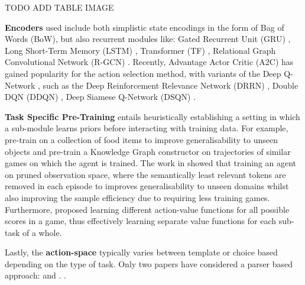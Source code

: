 \documentclass{article}
\begin{document}
TODO ADD TABLE IMAGE

\textbf{Encoders} used include both simplistic state encodings in the form of Bag of Words (BoW), but also recurrent modules like: Gated Recurrent Unit (GRU) \cite{Cho:2014}, Long Short-Term Memory (LSTM) \cite{Hochreiter:1997}, Transformer (TF) \cite{Vaswani:2017}, Relational Graph Convolutional Network (R-GCN) \cite{Schlichtkrull:2018}. Recently, Advantage Actor Critic (A2C) \cite{Mnih:2016} has gained popularity for the action selection method, with variants of the Deep Q-Network \cite{Mnih:2013}, such as the Deep Reinforcement Relevance Network  (DRRN) \cite{He:2015}, Double DQN (DDQN) \cite{Hasselt:2016}, Deep Siamese Q-Network (DSQN) \cite{Yin:2020snn}.

\textbf{Task Specific Pre-Training} entails heuristically establishing a setting in which a sub-module learns priors before interacting with training data. For example, \cite{Adolphs:2020} pre-train on a collection of food items to improve generalisability to unseen objects and \cite{Adhikari:2020} pre-train a Knowledge Graph constructor on trajectories of similar games on which the agent is trained. The work in \cite{Chaudhury:2020} showed that training an agent on pruned observation space, where the semantically least relevant tokens are removed in each episode to improves generalisability to unseen domains whilst also improving the sample efficiency due to requiring less training games. Furthermore, \cite{Jain:2020} proposed learning different action-value functions for all possible scores in a game, thus effectively learning separate value functions for each sub-task of a whole.

Lastly, the \textbf{action-space} typically varies between template or choice based depending on the type of task. Only two papers have considered a parser based approach: \cite{Narasimhan:2015} and \cite{Madotto:2020}. 
.
\printbibliography
\end{document}
